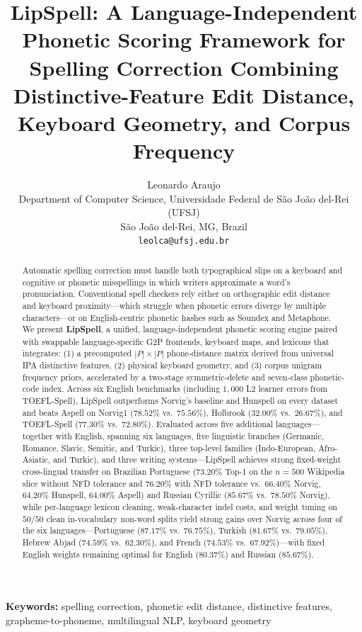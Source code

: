 \documentclass[11pt,a4paper]{article}
\title{LipSpell: A Language-Independent Phonetic Scoring Framework for Spelling Correction Combining Distinctive-Feature Edit Distance, Keyboard Geometry, and Corpus Frequency}
\author{
  Leonardo Araujo\\
  Department of Computer Science, Universidade Federal de S\~ao Jo\~ao del-Rei (UFSJ)\\
  S\~ao Jo\~ao del-Rei, MG, Brazil\\
  \texttt{leolca@ufsj.edu.br}
}
\date{}
\begin{document}
\onehalfspacing
\linenumbers
\maketitle

\begin{abstract}

Automatic spelling correction must handle both typographical slips on a keyboard and cognitive or phonetic misspellings in which writers approximate a word's pronunciation. Conventional spell checkers rely either on orthographic edit distance and keyboard proximity---which struggle when phonetic errors diverge by multiple characters---or on English-centric phonetic hashes such as Soundex and Metaphone. We present \textbf{LipSpell}, a unified, language-independent phonetic scoring engine paired with swappable language-specific G2P frontends, keyboard maps, and lexicons that integrates: (1) a precomputed $|P|\times|P|$ phone-distance matrix derived from universal IPA distinctive features, (2) physical keyboard geometry, and (3) corpus unigram frequency priors, accelerated by a two-stage symmetric-delete and seven-class phonetic-code index. Across six English benchmarks (including $1{,}000$ L2 learner errors from TOEFL-Spell), LipSpell outperforms Norvig's baseline and Hunspell on every dataset and beats Aspell on Norvig1 ($78.52\%$ vs.\ $75.56\%$), Holbrook ($32.00\%$ vs.\ $26.67\%$), and TOEFL-Spell ($77.30\%$ vs.\ $72.80\%$). Evaluated across five additional languages---together with English, spanning six languages, five linguistic branches (Germanic, Romance, Slavic, Semitic, and Turkic), three top-level families (Indo-European, Afro-Asiatic, and Turkic), and three writing systems---LipSpell achieves strong fixed-weight cross-lingual transfer on Brazilian Portuguese ($73.20\%$ Top-1 on the $n=500$ Wikipedia slice without NFD tolerance and $76.20\%$ with NFD tolerance vs.\ $66.40\%$ Norvig, $64.20\%$ Hunspell, $64.00\%$ Aspell) and Russian Cyrillic ($85.67\%$ vs.\ $78.50\%$ Norvig), while per-language lexicon cleaning, weak-character indel costs, and weight tuning on $50/50$ clean in-vocabulary non-word splits yield strong gains over Norvig across four of the six languages---Portuguese ($87.17\%$ vs.\ $76.75\%$), Turkish ($81.67\%$ vs.\ $79.05\%$), Hebrew Abjad ($74.59\%$ vs.\ $62.30\%$), and French ($74.53\%$ vs.\ $67.92\%$)---with fixed English weights remaining optimal for English ($80.37\%$) and Russian ($85.67\%$).
\end{abstract}

\noindent\textbf{Keywords:} spelling correction, phonetic edit distance, distinctive features, grapheme-to-phoneme, multilingual NLP, keyboard geometry
\end{document}
